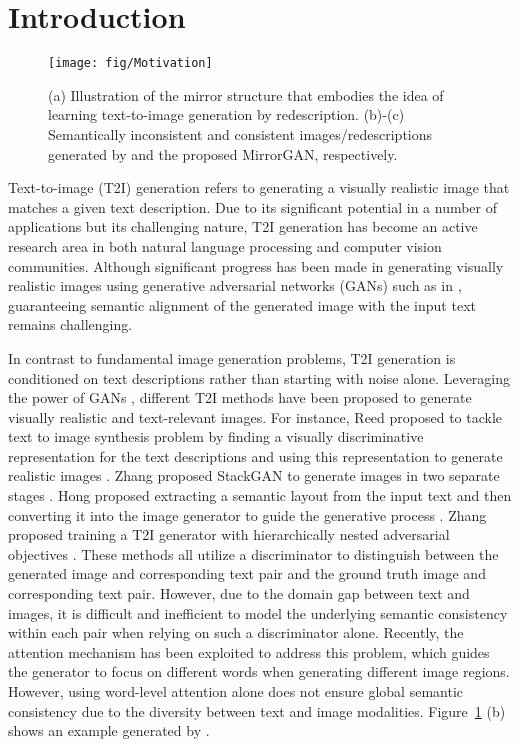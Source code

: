 \documentclass[10pt,twocolumn,letterpaper]{article}
\begin{document}
\section{Introduction}
\begin{figure}[tb!]
\centering
\noindent\texttt{[image: fig/Motivation]}
\protect\caption{(a) Illustration of the mirror structure that embodies the idea of learning text-to-image generation by redescription. (b)-(c) Semantically inconsistent and consistent images/redescriptions generated by \cite{xu2017attngan} and the proposed MirrorGAN, respectively.}
\label{fig:Motivation}
\end{figure}

Text-to-image (T2I) generation refers to generating a visually realistic image that matches a given text description. Due to its significant potential in a number of applications but its challenging nature, T2I generation has become an active research area in both natural language processing and computer vision communities. Although significant progress has been made in generating visually realistic images using generative adversarial networks (GANs) such as in \cite{zhang2017stackgan,zhang2018photographic,xu2017attngan,hong2018inferring}, guaranteeing semantic alignment of the generated image with the input text remains challenging.

In contrast to fundamental image generation problems, T2I generation is conditioned on text descriptions rather than starting with noise alone. Leveraging the power of GANs \cite{goodfellow2014generative}, different T2I methods have been proposed to generate visually realistic and text-relevant images. For instance, Reed \etal proposed to tackle text to image synthesis problem by finding a visually discriminative representation for the text descriptions and using this representation to generate realistic images \cite{reed2016generative}. Zhang \etal proposed StackGAN to generate images in two separate stages \cite{zhang2017stackgan}. Hong \etal proposed extracting a semantic layout from the input text and then converting it into the image generator to guide the generative process \cite{hong2018inferring}. Zhang \etal proposed training a T2I generator with hierarchically nested adversarial objectives \cite{zhang2018photographic}. These methods all utilize a discriminator to distinguish between the generated image and corresponding text pair and the ground truth image and corresponding text pair. However, due to the domain gap between text and images, it is difficult and inefficient to model the underlying semantic consistency within each pair when relying on such a discriminator alone. Recently, the attention mechanism \cite{xu2017attngan} has been exploited to address this problem, which guides the generator to focus on different words when generating different image regions. However, using word-level attention alone does not ensure global semantic consistency due to the diversity between text and image modalities. Figure~\ref{fig:Motivation} (b) shows an example generated by \cite{xu2017attngan}.
\end{document}

